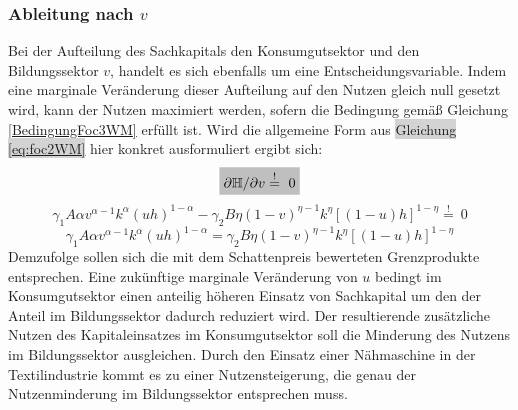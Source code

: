 \subsubsection*{Ableitung nach $v$}
Bei der Aufteilung des Sachkapitals den Konsumgutsektor und den Bildungssektor $v$, handelt es sich ebenfalls um eine Entscheidungsvariable. Indem eine marginale Veränderung dieser Aufteilung auf den Nutzen gleich null gesetzt wird, kann der Nutzen maximiert werden, sofern die Bedingung gemäß Gleichung \eqref{BedingungFoc3WM} erfüllt ist.
Wird die allgemeine Form aus \colorbox{lightgray}{Gleichung \eqref{eq:foc2WM}} hier konkret ausformuliert ergibt sich:
%
\begin{equation}
	\colorbox{lightgray}{$\partial\mathbb{H}/\partial v\overset{!}{=}~0$}
\end{equation}
%
\vspace{-0.5cm}
%
\begin{equation}
	\gamma_1A\alpha v^{\alpha-1}k^\alpha(uh)^{1-\alpha}-\gamma_2B\eta(1-v)^{\eta-1}k^\eta[(1-u)h]^{1-\eta}\overset{!}{=}~0
\end{equation}
%
\vspace{-0.7cm}
%
\begin{equation}
	\gamma_1A\alpha v^{\alpha-1}k^\alpha(uh)^{1-\alpha}=\gamma_2B\eta(1-v)^{\eta-1}k^\eta[(1-u)h]^{1-\eta}
\end{equation}
%
Demzufolge sollen sich die mit dem Schattenpreis bewerteten Grenzprodukte entsprechen. Eine zukünftige marginale Veränderung von $u$ bedingt im Konsumgutsektor einen anteilig höheren Einsatz von Sachkapital um den der Anteil im Bildungssektor dadurch reduziert wird. Der resultierende zusätzliche Nutzen des Kapitaleinsatzes im Konsumgutsektor soll die Minderung des Nutzens im Bildungssektor ausgleichen. Durch den Einsatz einer Nähmaschine in der Textilindustrie kommt es zu einer Nutzensteigerung, die genau der Nutzenminderung im Bildungssektor entsprechen muss. 
%
